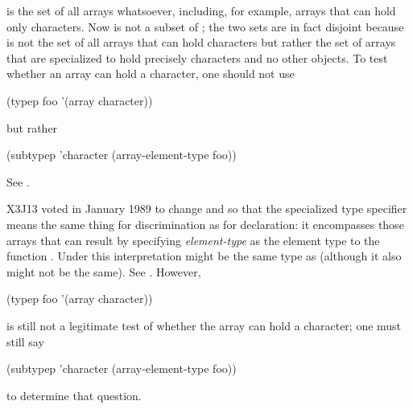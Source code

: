 \begin{flushdesc}
is the set of all arrays whatsoever, including, for example,
arrays that can hold only characters.  Now
 is not a subset of ; the two sets
are in fact disjoint because  is not the
set of all arrays that can hold characters but rather the set of
arrays that are specialized to hold precisely characters and no
other objects.  To test whether an array  can hold a character,
one should not use
\begin{lisp}
(typep foo '(array character))
\end{lisp}
but rather
\begin{lisp}
(subtypep 'character (array-element-type foo))
\end{lisp}
See .
\begin{new}
X3J13 voted in January 1989
to change  and 
so that the specialized  type specifier
means the same thing for discrimination
as for declaration: it encompasses those arrays
that can result by specifying {\it element-type} as the element type
to the function .
Under this interpretation  might be
the same type as 
(although it also might not be the same).
See .
However,
\begin{lisp}
(typep foo '(array character))
\end{lisp}
is still not a legitimate test of whether the array
 can hold a character; one must still say
\begin{lisp}
(subtypep 'character (array-element-type foo))
\end{lisp}
to determine that question.


\end{new}
\end{flushdesc}
